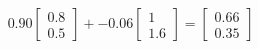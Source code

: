 \documentclass[preview]{standalone}
\begin{document}
\begin{align*}
0.90 \begin{bmatrix} 0.8 \\ 0.5 \end{bmatrix} + -0.06 \begin{bmatrix} 1 \\ 1.6 \end{bmatrix} = \begin{bmatrix} 0.66 \\ 0.35 \end{bmatrix}
\end{align*}
\end{document}
